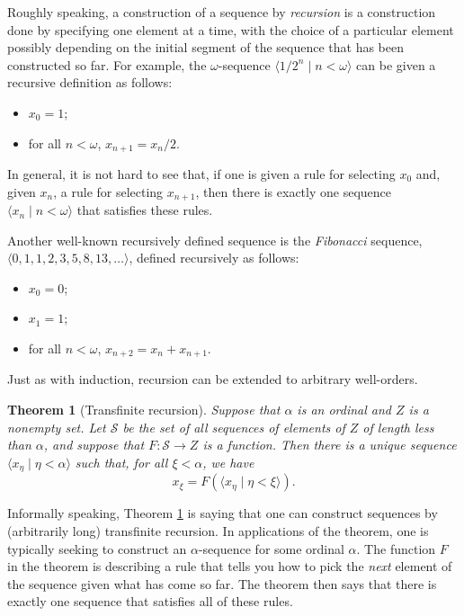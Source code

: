 \documentclass[a4paper]{memoir}
\newtheorem{theorem}{Theorem}[section]
\theoremstyle{definition}
\begin{document}
Roughly speaking, a construction of a sequence by \emph{recursion} is a construction done 
by specifying one element at a time, with the choice of a particular element possibly depending on 
the initial segment of the sequence that has been constructed so far. For example, the 
$\omega$-sequence $\langle 1/2^n \mid n < \omega \rangle$ can be given a recursive definition 
as follows:
\begin{itemize}
  \item $x_0 = 1$;
  \item for all $n < \omega$, $x_{n+1} = x_n/2$.
\end{itemize}

In general, it is not hard to see that, if one is given a rule for selecting $x_0$ and, given 
$x_n$, a rule for selecting $x_{n+1}$, then there is exactly one sequence $\langle x_n \mid n 
< \omega \rangle$ that satisfies these rules.

Another well-known recursively defined sequence is the \emph{Fibonacci} sequence, 
$\langle 0, 1, 1, 2, 3, 5, 8, 13, \ldots \rangle$, defined recursively as follows:
\begin{itemize}
  \item $x_0 = 0$;
  \item $x_1 = 1$;
  \item for all $n < \omega$, $x_{n+2} = x_n + x_{n+1}$.
\end{itemize}

Just as with induction, recursion can be extended to arbitrary well-orders. 

\begin{theorem}[Transfinite recursion] \label{thm: transfinite_recursion}
  Suppose that $\alpha$ is an ordinal and $Z$ is a nonempty set. Let $\mathcal{S}$ be the set of all 
  sequences of elements of $Z$ of length less than $\alpha$, and suppose that 
  $F: \mathcal{S} \rightarrow Z$ is a function. Then there is a unique sequence 
  $\langle x_\eta \mid \eta < \alpha \rangle$ such that, for all $\xi < \alpha$, we have
  \[
    x_\xi = F(\langle x_\eta \mid \eta < \xi \rangle).
  \]
\end{theorem}

Informally speaking, Theorem \ref{thm: transfinite_recursion} is saying that one can construct 
sequences by (arbitrarily long) transfinite recursion. In applications of the theorem, one is 
typically seeking to construct an $\alpha$-sequence for some ordinal $\alpha$. The function 
$F$ in the theorem is describing a rule that tells you how to pick the \emph{next} element of 
the sequence given what has come so far. The theorem then says that there is exactly one 
sequence that satisfies all of these rules.
\end{document}
